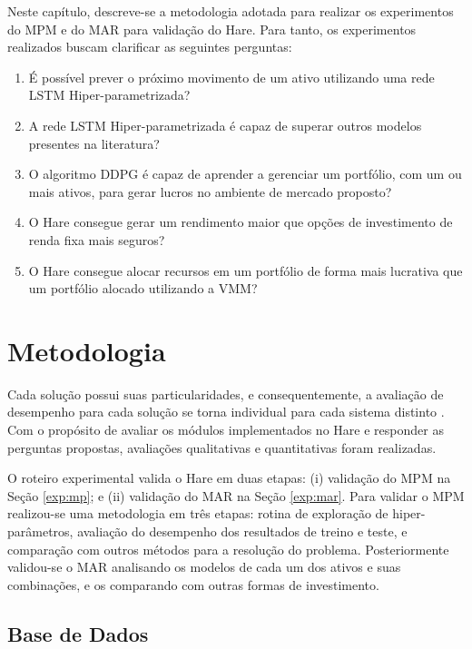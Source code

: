 \label{cap_res}

Neste capítulo, descreve-se a metodologia adotada para realizar os experimentos do \acrshort{MPM} e do \acrshort{MAR} para validação do Hare. Para tanto, os experimentos realizados buscam clarificar as seguintes perguntas:

\begin{enumerate}
    \item \label{peg1} É possível prever o próximo movimento de um ativo utilizando uma rede \acrshort{LSTM} Hiper-parametrizada?
    \item \label{peg2} A rede \acrshort{LSTM} Hiper-parametrizada é capaz de superar outros modelos presentes na literatura?
    \item \label{peg3} O algoritmo \acrshort{DDPG} é capaz de aprender a gerenciar um portfólio, com um ou mais ativos, para gerar lucros no ambiente de mercado proposto?
    \item \label{peg4} O Hare consegue gerar um rendimento maior que opções de investimento de renda fixa mais seguros?
    \item \label{peg5} O Hare consegue alocar recursos em um portfólio de forma mais lucrativa que um portfólio alocado utilizando a \acrlong{VMM}?
\end{enumerate}


\section{Metodologia}

Cada solução possui suas particularidades, e consequentemente, a avaliação de desempenho para cada solução se torna individual para cada sistema distinto \cite{jain1990art}. Com o propósito de avaliar os módulos implementados no Hare e responder as perguntas propostas, avaliações qualitativas e quantitativas foram realizadas.

O roteiro experimental valida o Hare em duas etapas: (i) validação do \acrshort{MPM} na Seção \ref{exp:mp}; e (ii) validação do \acrshort{MAR} na Seção \ref{exp:mar}. Para validar o \acrshort{MPM} realizou-se uma metodologia em três etapas: rotina de exploração de hiper-parâmetros, avaliação do desempenho dos resultados de treino e teste, e comparação com outros métodos para a resolução do problema. Posteriormente validou-se o \acrshort{MAR} analisando os modelos de cada um dos ativos e suas combinações, e os comparando com outras formas de investimento.

\subsection{Base de Dados}
\label{SEC:data-set}

